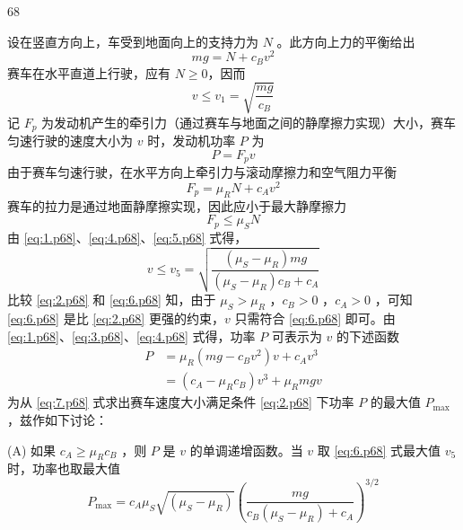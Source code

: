 \begin{solution}{68}
    \begin{subsolution}
        设在竖直方向上，车受到地面向上的支持力为 $N$ 。此方向上力的平衡给出
        \begin{equation}
            mg = N + c_{B} v^{2} \label{eq:1.p68}
        \end{equation}
        赛车在水平直道上行驶，应有 $N \geq 0$，因而
        \begin{equation}
            v \leq v_{1} = \sqrt{\frac{mg}{c_{B}}} \label{eq:2.p68}
        \end{equation}
        记 $F_{p}$ 为发动机产生的牵引力（通过赛车与地面之间的静摩擦力实现）大小，赛车匀速行驶的速度大小为 $v$ 时，发动机功率 $P$ 为
        \begin{equation}
            P = F_{p} v \label{eq:3.p68}
        \end{equation}
        由于赛车匀速行驶，在水平方向上牵引力与滚动摩擦力和空气阻力平衡
        \begin{equation}
            F_{p} = \mu_{R} N + c_{A} v^{2} \label{eq:4.p68}
        \end{equation}
        赛车的拉力是通过地面静摩擦实现，因此应小于最大静摩擦力
        \begin{equation}
            F_{p} \leq \mu_{S} N \label{eq:5.p68}
        \end{equation}
        由 \eqref{eq:1.p68}、\eqref{eq:4.p68}、\eqref{eq:5.p68} 式得，
        \begin{equation}
            v \leq v_{5} = \sqrt{\frac{(\mu_{S} - \mu_{R}) mg}{(\mu_{S} - \mu_{R}) c_{B} + c_{A}}} \label{eq:6.p68}
        \end{equation}
        比较 \eqref{eq:2.p68} 和 \eqref{eq:6.p68} 知，由于 $\mu_{S} > \mu_{R}$ ，$c_{B} > 0$ ，$c_{A} > 0$ ，可知 \eqref{eq:6.p68} 是比 \eqref{eq:2.p68} 更强的约束，$v$ 只需符合 \eqref{eq:6.p68} 即可。由 \eqref{eq:1.p68}、\eqref{eq:3.p68}、\eqref{eq:4.p68} 式得，功率 $P$ 可表示为 $v$ 的下述函数
        \begin{align}
            P &= \mu_{R} (mg - c_{B} v^{2}) v + c_{A} v^{3} \nonumber \\
              &= (c_{A} - \mu_{R} c_{B}) v^{3} + \mu_{R} mg v \label{eq:7.p68}
        \end{align}
        为从 \eqref{eq:7.p68} 式求出赛车速度大小满足条件 \eqref{eq:2.p68} 下功率 $P$ 的最大值 $P_{\max}$ ，兹作如下讨论：

        (A) 如果 $c_{A} \geq \mu_{R} c_{B}$ ，则 $P$ 是 $v$ 的单调递增函数。当 $v$ 取 \eqref{eq:6.p68} 式最大值 $v_{5}$ 时，功率也取最大值
        \begin{equation}
            P_{\max} = c_{A} \mu_{S} \sqrt{(\mu_{S} - \mu_{R})} \left( \frac{mg}{c_{B}(\mu_{S} - \mu_{R}) + c_{A}} \right)^{3/2} \label{eq:8.p68}
        \end{equation}


\end{subsolution}
\end{solution}
